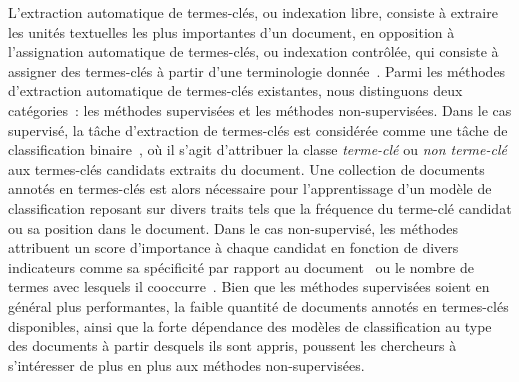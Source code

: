   L'extraction automatique de termes-clés, ou indexation libre,
  consiste à extraire les unités textuelles les plus importantes d'un document,
  en opposition à l'assignation automatique de termes-clés, ou
  indexation contrôlée, qui consiste à assigner des termes-clés à partir d'une
  terminologie donnée~\cite{paroubek2012deft}. Parmi les méthodes d'extraction
  automatique de termes-clés existantes, nous distinguons deux catégories~: les
  méthodes supervisées et les méthodes non-supervisées. Dans le cas supervisé,
  la tâche d'extraction de termes-clés est considérée comme une tâche de
  classification binaire~\cite{witten1999kea}, où il s'agit d'attribuer la
  classe \og{}\textit{terme-clé}\fg{} ou \og{}\textit{non terme-clé}\fg{} aux
  termes-clés candidats extraits du document.
  Une collection de documents annotés en termes-clés est alors nécessaire pour l'apprentissage d'un modèle de classification reposant sur divers traits tels que la fréquence du terme-clé candidat ou sa position dans le document.
  Dans le cas non-supervisé, les méthodes attribuent un score d'importance à chaque candidat en fonction de divers indicateurs comme sa spécificité par rapport au document~\cite{paukkeri2010likey} ou le nombre de termes avec lesquels il cooccurre~\cite{matsuo2004wordcooccurrence}.
  Bien que les méthodes supervisées soient en général plus performantes, la
  faible quantité de documents annotés en termes-clés disponibles, ainsi que la
  forte dépendance des modèles de classification au type des documents à partir
  desquels ils sont appris, poussent les chercheurs à s'intéresser de plus en
  plus aux méthodes non-supervisées.

